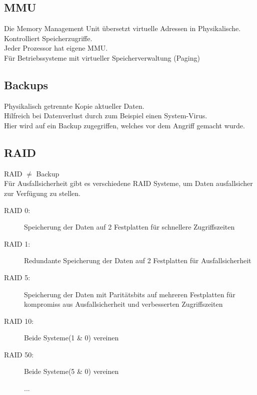\documentclass[12pt,a4paper]{article}
\begin{document}
	\subsection{MMU}
		Die Memory Management Unit übersetzt virtuelle Adressen in Physikalische.\\
		Kontrolliert Speicherzugriffe.\\
		Jeder Prozessor hat eigene MMU.\\
		Für Betriebssysteme mit virtueller Speicherverwaltung (Paging)

	\subsection{Backups}
		Physikalisch getrennte Kopie aktueller Daten.\\
		Hilfreich bei Datenverlust durch zum Beispiel einen System-Virus.\\ 
		Hier wird auf ein Backup zugegriffen, welches vor dem Angriff gemacht wurde.\\

	\subsection{RAID}
		RAID $\neq$ Backup\\
		Für Ausfallsicherheit gibt es verschiedene RAID Systeme, um Daten ausfallsicher zur Verfügung zu stellen.\\
		\begin{description}
			\item[RAID 0:] Speicherung der Daten auf 2 Festplatten für schnellere Zugriffszeiten
			\item[RAID 1:] Redundante Speicherung der Daten auf 2 Festplatten für Ausfallsicherheit
			\item[RAID 5:] Speicherung der Daten mit Paritätsbits auf mehreren Festplatten für kompromiss aus Ausfallsicherheit und verbesserten Zugriffszeiten
			\item[RAID 10:] Beide Systeme(1 \& 0) vereinen 
			\item[RAID 50:] Beide Systeme(5 \& 0) vereinen 
			\item[] ...
		\end{description}
	
\end{document}
